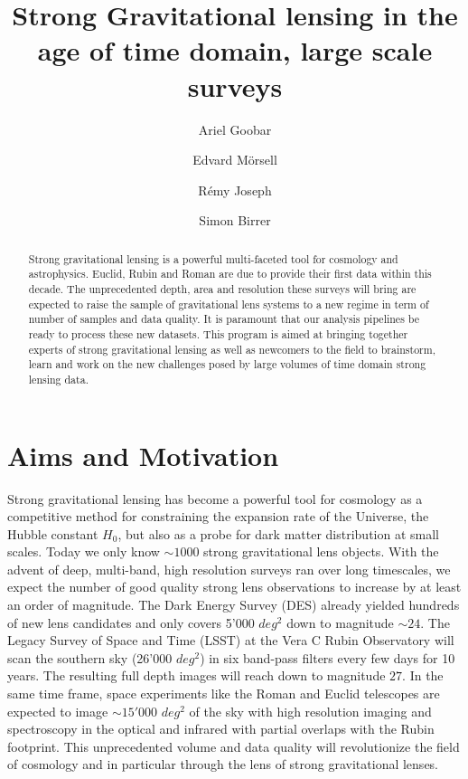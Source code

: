 \documentclass[11pt, letterpaper]{article}
\author[1]{Ariel Goobar}
\author[1]{Edvard M{\"o}rsell}
\author[1]{R\'emy Joseph}
\author[2]{Simon Birrer}
\affil[1]{The Oskar Klein Centre, Department of Physics, Stockholm University, AlbaNova, SE-10691 Stockholm, Sweden}
\affil[2]{Kavli Institute for Particle Astrophysics and Cosmology and Department of Physics, Stanford University, Stanford, CA 94305, USA}
\begin{document}
\title{Strong Gravitational lensing in the age of time domain, large scale surveys}
\maketitle

\begin{abstract}
    Strong gravitational lensing is a powerful multi-faceted tool for cosmology and astrophysics. Euclid, Rubin and Roman are due to provide their first data within this decade. The unprecedented depth, area and resolution these surveys will bring are expected to raise the sample of gravitational lens systems to a new regime in term of number of samples and data quality. It is paramount that our analysis pipelines  be ready to process these new datasets.
    This program is aimed at bringing together experts of strong gravitational lensing as well as newcomers to the field to brainstorm, learn and work on the new challenges posed by large volumes of time domain strong lensing data.
    
    
\end{abstract}


\section{Aims and Motivation}
    Strong gravitational lensing has become a powerful tool for cosmology as a competitive method for constraining the expansion rate of the Universe, the Hubble constant $H_0$, but also as a probe for dark matter distribution at small scales. Today we only know $\sim 1000$ strong gravitational lens objects. With the advent of deep, multi-band, high resolution surveys ran over long timescales, we expect the number of good quality strong lens observations to increase by at least an order of magnitude. The Dark Energy Survey (DES) already yielded hundreds of new lens candidates and only covers 5'000 $deg^2$ down to magnitude $\sim 24$. The Legacy Survey of Space and Time (LSST) at the Vera C Rubin Observatory will scan the southern sky (26'000 $deg^2$) in six band-pass filters every few days for 10 years. The resulting full depth images will reach down to magnitude $27$. In the same time frame, space experiments like the Roman and Euclid telescopes are expected to image $\sim 15'000$ $deg^2$ of the sky with high resolution imaging and spectroscopy in the optical and infrared with partial overlaps with the Rubin footprint. This unprecedented volume and data quality will revolutionize the field of cosmology and in particular through the lens of strong gravitational lenses. 
    
\end{document}

